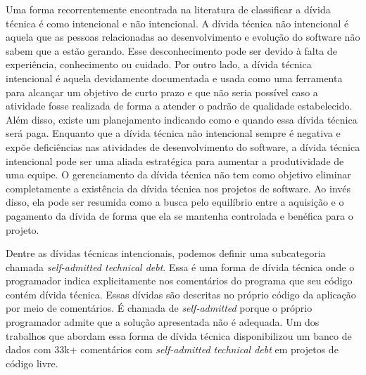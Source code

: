Uma forma recorrentemente encontrada na literatura de classificar a dívida técnica é como intencional e não intencional\cite{sterling2010managing,brown2010managing,klinger2011enterprise}. A dívida técnica não intencional é aquela que as pessoas relacionadas ao desenvolvimento e evolução do software não sabem que a estão gerando. Esse desconhecimento pode ser devido à falta de experiência, conhecimento ou cuidado. Por outro lado, a dívida técnica intencional é aquela devidamente documentada e usada como uma ferramenta para alcançar um objetivo de curto prazo e que não seria possível caso a atividade fosse realizada de forma a atender o padrão de qualidade estabelecido.  Além disso, existe um planejamento indicando como e quando essa dívida técnica será paga. Enquanto que a dívida técnica não intencional sempre é negativa e expõe deficiências nas atividades de desenvolvimento do software, a dívida técnica intencional pode ser uma aliada estratégica para aumentar a produtividade de uma equipe. O gerenciamento da dívida técnica não tem como objetivo eliminar completamente a existência da dívida técnica nos projetos de software. Ao invés disso, ela pode ser resumida como a busca pelo equilíbrio entre a aquisição e o pagamento da dívida de forma que ela se mantenha controlada e benéfica para o projeto. 

Dentre as dívidas técnicas intencionais, podemos definir uma subcategoria chamada \textit{self-admitted technical debt}. Essa é uma forma de dívida técnica onde o programador indica explicitamente nos comentários do programa que seu código contém dívida técnica. Essas dívidas são descritas no próprio código da aplicação por meio de comentários. É chamada de \textit{self-admitted} porque o próprio programador admite que a solução apresentada não é adequada. Um dos trabalhos que abordam essa forma de dívida técnica\cite{maldonado2015detecting} disponibilizou um banco de dados com  33k+ comentários com \textit{self-admitted technical debt} em projetos de código livre.


